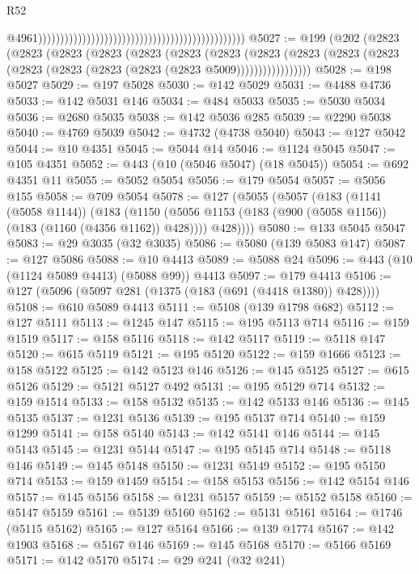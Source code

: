 \begin{lexlean}{R52}
\begin{coremodule}
                                                                                                  @4961)))))))))))))))))))))))))))))))))))))))))))))))
@5027 := @199
    (@202
      (@2823
        (@2823
          (@2823
            (@2823
              (@2823
                (@2823
                  (@2823
                    (@2823
                      (@2823 (@2823 (@2823 (@2823 (@2823 (@2823 (@2823 (@2823 @5009)))))))))))))))))
@5028 := @198 @5027
@5029 := @197 @5028
@5030 := @142 @5029
@5031 := @4488 @4736
@5033 := @142 @5031 @146
@5034 := @484 @5033
@5035 := @5030 @5034
@5036 := @2680 @5035
@5038 := @142 @5036 @285
@5039 := @2290 @5038
@5040 := @4769 @5039
@5042 := @4732 (@4738 @5040)
@5043 := @127 @5042
@5044 := @10 @4351
@5045 := @5044 @14
@5046 := @1124 @5045
@5047 := @105 @4351
@5052 := @443 (@10 (@5046 @5047) (@18 @5045))
@5054 := @692 @4351 @11
@5055 := @5052 @5054
@5056 := @179 @5054
@5057 := @5056 @155
@5058 := @709 @5054
@5078 := @127
    (@5055
      (@5057
        (@183
          (@1141 (@5058 @1144))
          (@183
            (@1150 (@5056 @1153 (@183 (@900 (@5058 @1156)) (@183 (@1160 (@4356 @1162)) @428))))
            @428))))
@5080 := @133 @5045 @5047
@5083 := @29 @3035 (@32 @3035)
@5086 := @5080 (@139 @5083 @147)
@5087 := @127 @5086
@5088 := @10 @4413
@5089 := @5088 @24
@5096 := @443 (@10 (@1124 @5089 @4413) (@5088 @99)) @4413
@5097 := @179 @4413
@5106 := @127 (@5096 (@5097 @281 (@1375 (@183 (@691 (@4418 @1380)) @428))))
@5108 := @610 @5089 @4413
@5111 := @5108 (@139 @1798 @682)
@5112 := @127 @5111
@5113 := @1245 @147
@5115 := @195 @5113 @714
@5116 := @159 @1519
@5117 := @158 @5116
@5118 := @142 @5117
@5119 := @5118 @147
@5120 := @615 @5119
@5121 := @195 @5120
@5122 := @159 @1666
@5123 := @158 @5122
@5125 := @142 @5123 @146
@5126 := @145 @5125
@5127 := @615 @5126
@5129 := @5121 @5127 @492
@5131 := @195 @5129 @714
@5132 := @159 @1514
@5133 := @158 @5132
@5135 := @142 @5133 @146
@5136 := @145 @5135
@5137 := @1231 @5136
@5139 := @195 @5137 @714
@5140 := @159 @1299
@5141 := @158 @5140
@5143 := @142 @5141 @146
@5144 := @145 @5143
@5145 := @1231 @5144
@5147 := @195 @5145 @714
@5148 := @5118 @146
@5149 := @145 @5148
@5150 := @1231 @5149
@5152 := @195 @5150 @714
@5153 := @159 @1459
@5154 := @158 @5153
@5156 := @142 @5154 @146
@5157 := @145 @5156
@5158 := @1231 @5157
@5159 := @5152 @5158
@5160 := @5147 @5159
@5161 := @5139 @5160
@5162 := @5131 @5161
@5164 := @1746 (@5115 @5162)
@5165 := @127 @5164
@5166 := @139 @1774
@5167 := @142 @1903
@5168 := @5167 @146
@5169 := @145 @5168
@5170 := @5166 @5169
@5171 := @142 @5170
@5174 := @29 @241 (@32 @241)

\end{coremodule}
\end{lexlean}

